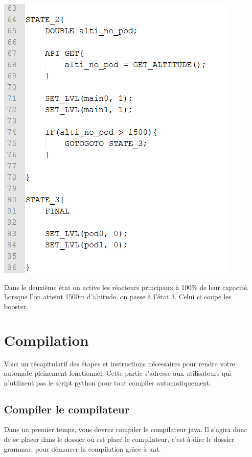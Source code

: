\documentclass[a4paper,11pt]{article}
\begin{document}
\begin{center}
	\includegraphics[scale=0.75]{img/otto3.png}
\end{center}

Dans le deuxième état on active les réacteurs principaux à 100\% de leur capacité.
Lorsque l'on atteint 1500m d'altitude, on passe à l'état 3. Celui ci coupe les booster.

\section{Compilation}

Voici un récapitulatif des étapes et instructions nécessaires pour rendre votre automate pleinement fonctionnel. Cette partie s'adresse aux utilisateurs qui n'utilisent pas le script python pour tout compiler automatiquement.

\subsection{Compiler le compilateur}
\onehalfspacing 

Dans un premier temps, vous devrez compiler le compilateur java. Il s'agira donc de se placer dans le dossier où est placé le compilateur, c'est-à-dire le dossier grammar, pour démarrer la compilation grâce à ant.
\end{document}
